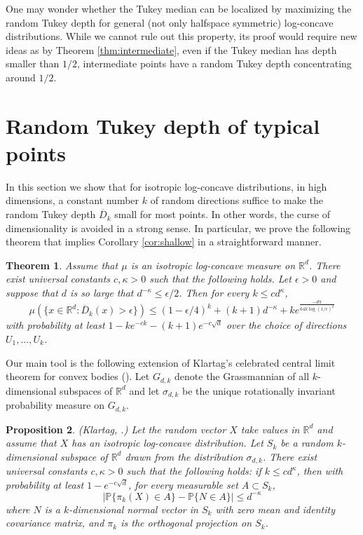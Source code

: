 \documentclass[12pt]{article}
\newcommand{\R}{\mathbb{R}}
\newcommand{\ol}{\overline}
\newcommand{\field}[1]{\mathbb{#1}}
\newcommand{\PROB}{\field{P}}
\newtheorem{theorem}{Theorem}
\newtheorem{proposition}[theorem]{Proposition}
\begin{document}
One may wonder whether the Tukey median can be localized by
  maximizing the random Tukey depth for general (not only halfspace
  symmetric) log-concave distributions. While we cannot rule out this
  property, its proof would require new ideas as by Theorem \ref{thm:intermediate},
  even if the Tukey median has depth smaller than $1/2$,
  intermediate points have a random Tukey depth concentrating around
  $1/2$. 





\section{Random Tukey depth of typical points}
\label{sec:shallow}


In this section we show that for isotropic log-concave distributions, in high dimensions,
a constant number $k$ of random directions suffice to make the random Tukey depth $\ol{D}_k$
small for most points.
In other words, the curse of dimensionality is avoided in a
strong sense.
In particular, we prove the following theorem that implies Corollary \ref{cor:shallow}
in a straightforward manner.

  \begin{theorem}
    \label{thm:shallow}
Assume that $\mu$ is an isotropic log-concave measure on $\R^d$.
There exist universal constants $c,\kappa>0$ such that the following holds.
Let $\epsilon>0$ and suppose that $d$ is so large that $d^{-\kappa} \le \epsilon/2$.
Then for every $k\le cd^{\kappa}$,
\[
\mu\left(\{x\in \R^d: \ol{D}_k(x) > \epsilon\}\right) \le (1-\epsilon/4)^k + (k+1)d^{-\kappa} + ke^{\frac{-d\pi}{64 k \log(1/\epsilon)^2}}
\]
with probability at least $1-ke^{-ck} -(k+1)e^{-c\sqrt{d}}$ over the choice of directions $U_1, \dots, U_k$.
\end{theorem}

 
Our main tool is the following extension of Klartag's celebrated 
central limit theorem for convex bodies (\cite{Kla07a}).
Let $G_{d,k}$ denote the Grassmannian of all $k$-dimensional subspaces of $\R^d$
and let $\sigma_{d,k}$ be the unique rotationally invariant probability measure on $G_{d,k}$.

\begin{proposition}
\label{klartag}
(Klartag, \cite{Kla07b}.)
Let the random vector $X$ take values in $\R^d$ and assume that $X$ has an isotropic
log-concave distribution.
Let $S_k$ be a random $k$-dimensional subspace of $\R^d$ drawn from the distribution
$\sigma_{d,k}$. There exist universal 
constants $c,\kappa>0$ such that the following holds: if $k\le cd^{\kappa}$, then
with probability at least $1-e^{-c\sqrt{d}}$, for every measurable set $A\subset S_k$,
\[
   \left|\PROB\{\pi_k(X) \in A \} - \PROB\{N \in A\}\right| \le d^{-\kappa}
\]
where $N$ is a $k$-dimensional normal vector in $S_k$ with zero mean and identity covariance matrix, and $\pi_k$ is the orthogonal projection on $S_k$.
\end{proposition}
\end{document}
